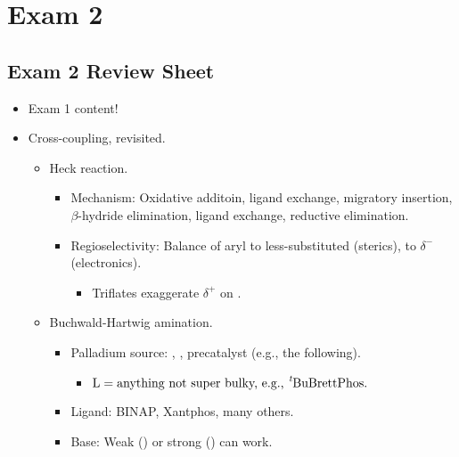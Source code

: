 \documentclass[../notes.tex]{subfiles}
\begin{document}
\chapter{Exam 2}
\section{Exam 2 Review Sheet}
\begin{itemize}
    \item {}Exam 1 content!
    \item Cross-coupling, revisited.
    \begin{itemize}
        \item Heck reaction.
        \begin{itemize}
            \item Mechanism: Oxidative additoin, ligand exchange, migratory insertion, $\beta$-hydride elimination, ligand exchange, reductive elimination.
            \item Regioselectivity: Balance of aryl to less-substituted  (sterics),  to $\delta^-$  (electronics).
            \begin{itemize}
                \item Triflates exaggerate $\delta^+$ on .
            \end{itemize}
        \end{itemize}
        \item Buchwald-Hartwig amination.
        \begin{itemize}
            \item Palladium source: , , precatalyst (e.g., the following).
            \begin{center}
                \vspace{0.5em}
                \footnotesize
                \vspace{0.5em}
            \end{center}
            \begin{itemize}
                \item $\ce{L}=\text{anything not super bulky, e.g., \ce{{}^{\emph{t}}BuBrettPhos}.}$
            \end{itemize}
            \item Ligand: BINAP, Xantphos, many others.
            \item Base: Weak () or strong () can work.

\end{itemize}
\end{itemize}
\end{itemize}
\end{document}
